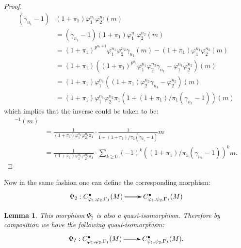 \documentclass[12pt]{amsart}
\newtheorem{lemma}[theorem]{Lemma}
\theoremstyle{definition}
\numberwithin{equation}{section}
\begin{document}
\begin{proof}
\begin{align}
(\gamma_{n_1}-1)&(1+\pi_1)\varphi_1^{n_1}\varphi_2^{n_2}(m)\\
&=(\gamma_{n_1}-1)(1+\pi_1)\varphi_1^{n_1}\varphi_2^{n_2}(m)\\
&=(1+\pi_1)^{p^{n_1+1}}\varphi_1^{n_1}\varphi_2^{n_2}\gamma_{n_1}(m)-(1+\pi_1)\varphi_1^{n_1}\varphi_2^{n_2}(m)\\
&=(1+\pi_1)((1+\pi_1)^{p^{n_1}}\varphi_1^{n_1}\varphi_2^{n_2}\gamma_{n_1}-\varphi_1^{n_1}\varphi_2^{n_2})(m)\\
&=(1+\pi_1)\varphi_1^{n_1}((1+\pi_1)\varphi_2^{n_2}\gamma_{n_1}-\varphi_2^{n_2})(m)\\
&=(1+\pi_1)\varphi_1^{n_1}\varphi_2^{n_2}\pi_1(1+(1+\pi_1)/\pi_1(\gamma_{n_1}-1))(m)
\end{align}
which implies that the inverse could be taken to be:
\begin{align}
[(1+\pi_1)\varphi_1^{n_1}&\varphi_2^{n_2}\pi_1(1+(1+\pi_1)/\pi_1(\gamma_{n_1}-1))]^{-1}(m)	\\
&=\frac{1}{(1+\pi_1)\varphi_1^{n_1}\varphi_2^{n_2}\pi_1}\cdot \frac{1}{1+(1+\pi_1)/\pi_1(\gamma_{n_1}-1)}m\\
&=\frac{1}{(1+\pi_1)\varphi_1^{n_1}\varphi_2^{n_2}\pi_1}\cdot \sum_{k\geq 0}(-1)^k((1+\pi_1)/\pi_1(\gamma_{n_1}-1))^k m.
\end{align}
\end{proof}




\indent Now in the same fashion one can define the corresponding morphism:
\[
\xymatrix@R+0pc@C+0pc{
\Psi_2: C^\bullet_{\varphi_1,\varphi_2,\Gamma_I}(M) \ar[r] \ar[r] \ar[r]  & C^\bullet_{\varphi_1,\psi_2,\Gamma_I}(M)
}
\]


\begin{lemma}
This morphism $\Psi_2$ is also a quasi-isomorphism. Therefore by composition we have the following quasi-isomorphism:
\[
\xymatrix@R+0pc@C+0pc{
\Psi_I: C^\bullet_{\varphi_1,\varphi_2,\Gamma_I}(M) \ar[r] \ar[r] \ar[r]  & C^\bullet_{\psi_1,\psi_2,\Gamma_I}(M).
}
\]


	
\end{lemma}
\end{document}
